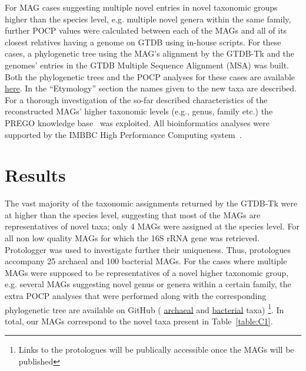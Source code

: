    For MAG cases suggesting multiple novel entries in novel taxonomic groups higher than the species level, 
    e.g. multiple novel genera within the same family, further POCP values were calculated between each of the MAGs 
    and all of its closest relatives having a genome on GTDB using in-house scripts. 
    For these cases, a phylogenetic tree using the MAG’s alignment by the GTDB-Tk and the genomes’ entries in the 
    GTDB Multiple Sequence Alignment (MSA) was built. 
    Both the phylogenetic trees and the POCP analyses for these cases are available \href{https://github.com/hariszaf/karpathos-swamp/tree/main/MAGs/Phylogenies}{here}. 
    In the “Etymology” section the names given to the new taxa are described. 
    For a thorough investigation of the so-far described characteristics of the reconstructed MAGs’ higher taxonomic levels 
    (e.g., genus, family etc.) the PREGO knowledge base~\citep{zafeiropoulos_prego_2022} was exploited.
    All bioinformatics analyses were supported by the IMBBC High Performance Computing system~\citep{zafeiropoulos_0s_2021}.



\section{Results}

    The vast majority of the taxonomic assignments returned by the GTDB-Tk were 
    at higher than the species level, 
    suggesting that most of the MAGs are representatives of novel taxa; 
    only 4 MAGs were assigned at the species level. 
    For all non low quality MAGs for which the 16S rRNA gene was retrieved.
    Protologger was used to investigate further their uniqueness. 
    Thus, protologues~\citep{tindall_note_1999} accompany 25 archaeal and 100 bacterial 
    MAGs. 
    For the cases where multiple MAGs were supposed to be representatives 
    of a novel higher taxonomic group, e.g. several MAGs suggesting novel genus 
    or genera within a certain family, the extra POCP analyses that were performed 
    along with the corresponding phylogenetic tree are available 
    on GitHub (
        \href{https://github.com/hariszaf/karpathos-swamp/tree/main/MAGs/arc/with_16S}{archaeal} 
        and 
        \href{https://github.com/hariszaf/karpathos-swamp/tree/main/MAGs/bac/with_16S}{bacterial} taxa)
        \footnote{
            Links to the protologues will be publically accessible once the MAGs will 
            be published
        }. 
    In total, our MAGs correspond to the novel taxa present in Table~\ref{table:C1}.


